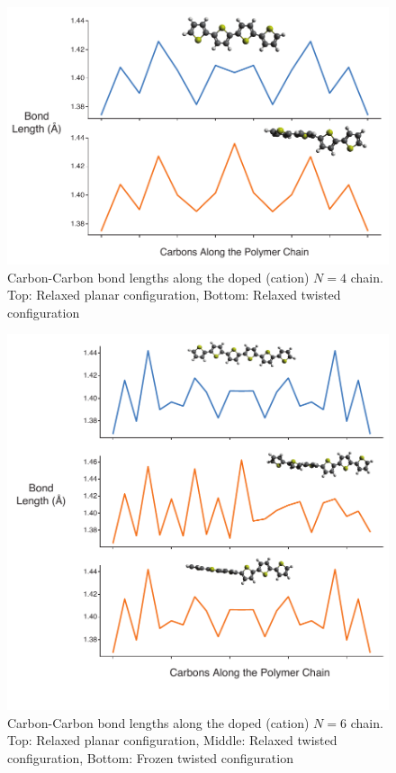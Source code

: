 \begin{figure}[hbt!]
    \centering
    \includegraphics{figures/append_tor_model/n4_fig_w.pdf}
    \caption[Polaron Localization in PT Chain (N = 4)]{Carbon-Carbon bond lengths along the doped (cation) $N = 4$ chain. Top: Relaxed planar configuration, Bottom: Relaxed twisted configuration}
    \label{fig:n4_bl}
\end{figure}

\begin{figure}[hbt!]
    \centering
    \includegraphics{figures/append_tor_model/n6_fig_w.pdf}
    \caption[Polaron Localization in PT Chain (N = 6)]{Carbon-Carbon bond lengths along the doped (cation) $N = 6$ chain. Top: Relaxed planar configuration, Middle: Relaxed twisted configuration, Bottom: Frozen twisted configuration}
    \label{fig:n6_bl}
\end{figure}

